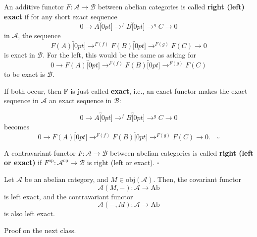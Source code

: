 \documentclass[../category_theory.tex]{subfiles}
\begin{document}
\begin{def*}
	An additive functor \(F:\mathcal{A}\rightarrow \mathcal{B}\) between abelian categories is called \textbf{right (left) exact} if for any short exact sequence
	\[
		0\rightarrow A\overbracket[0pt]{\rightarrow}^{f} B\overbracket[0pt]{\rightarrow}^{g} C\rightarrow 0
	\]
	in \(\mathcal{A}\), the sequence
	\[
		F(A)\overbracket[0pt]{\rightarrow}^{F(f)}F(B)\overbracket[0pt]{\rightarrow}^{F(g)}F(C)\rightarrow 0
	\]
	is exact in \(\mathcal{B}\).
	For the left, this would be the same as asking for
	\[
		0\rightarrow F (A)\overbracket[0pt]{\rightarrow}^{F(f)}F(B)\overbracket[0pt]{\rightarrow}^{F(g)}F(C)
	\]
	to be exact is \(\mathcal{B}\).

	If both occur, then F is just called \textbf{exact}, i.e., an exact functor makes the exact sequence in \(\mathcal{A}\) an exact sequence in \(\mathcal{B}\):

	\[
		0\rightarrow A\overbracket[0pt]{\rightarrow}^{f} B\overbracket[0pt]{\rightarrow}^{g} C\rightarrow 0
	\]
	becomes
	\[
		0\rightarrow F (A)\overbracket[0pt]{\rightarrow}^{F(f)}F(B)\overbracket[0pt]{\rightarrow}^{F(g)}F(C)\rightarrow 0.\quad \square
	\]
\end{def*}
\begin{def*}
	A contravariant functor \(F:\mathcal{A}\rightarrow \mathcal{B}\) between abelian categories is called \textbf{right (left or exact)} if \(F^{\mathrm{op}}:\mathcal{A}^{\mathrm{op}}\rightarrow \mathcal{B}\) is right (left or exact). \(\square\)
\end{def*}
\begin{prop*}
	Let \(\mathcal{A}\) be an abelian category, and \(M\in \mathrm{obj}(\mathcal{A})\). Then, the covariant functor
	\[
		\mathcal{A}(M, -):\mathcal{A}\rightarrow \mathrm{Ab}
	\]
	is left exact, and the contravariant functor
	\[
		\mathcal{A}(-, M):\mathcal{A}\rightarrow \mathrm{Ab}
	\]
	is also left exact.
\end{prop*}
Proof on the next class.
\end{document}
